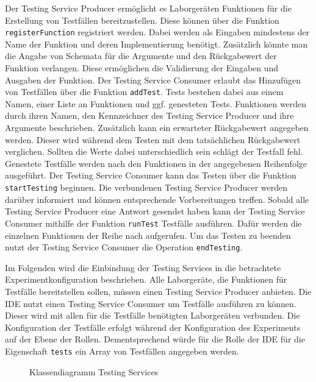Der Testing Service Producer ermöglicht es Laborgeräten Funktionen für die Erstellung von Testfällen bereitzustellen. Diese können über die Funktion \texttt{registerFunction} registriert werden. Dabei werden als Eingaben mindestens der Name der Funktion und deren Implementierung benötigt. Zusätzlich könnte man die Angabe von Schemata für die Argumente und den Rückgabewert der Funktion verlangen. Diese ermöglichen die Validierung der Eingaben und Ausgaben der Funktion. Der Testing Service Consumer erlaubt das Hinzufügen von Testfällen über die Funktion \texttt{addTest}. Tests bestehen dabei aus einem Namen, einer Liste an Funktionen und ggf. genesteten Tests. Funktionen werden durch ihren Namen, den Kennzeichner des Testing Service Producer und ihre Argumente beschrieben. Zusätzlich kann ein erwarteter Rückgabewert angegeben werden. Dieser wird während dem Testen mit dem tatsächlichen Rückgabewert verglichen. Sollten die Werte dabei unterschiedlich sein schlägt der Testfall fehl. Genestete Testfälle werden nach den Funktionen in der angegebenen Reihenfolge ausgeführt. Der Testing Service Consumer kann das Testen über die Funktion \texttt{startTesting} beginnen. Die verbundenen Testing Service Producer werden darüber informiert und können entsprechende Vorbereitungen treffen. Sobald alle Testing Service Producer eine Antwort gesendet haben kann der Testing Service Consumer mithilfe der Funktion \texttt{runTest} Testfälle ausführen. Dafür werden die einzelnen Funktionen der Reihe nach aufgerufen. Um das Testen zu beenden nutzt der Testing Service Consumer die Operation \texttt{endTesting}.

Im Folgenden wird die Einbindung der Testing Services in die betrachtete Experimentkonfiguration beschrieben. Alle Laborgeräte, die Funktionen für Testfälle bereitstellen sollen, müssen einen Testing Service Producer anbieten. Die IDE nutzt einen Testing Service Consumer um Testfälle ausführen zu können. Dieser wird mit allen für die Testfälle benötigten Laborgeräten verbunden. Die Konfiguration der Testfälle erfolgt während der Konfiguration des Experiments auf der Ebene der Rollen. Dementsprechend würde für die Rolle der IDE für die Eigenschaft \texttt{tests} ein Array von Testfällen angegeben werden.

\begin{figure}[tbp]
    \centering
    \caption{Klassendiagramm Testing Services}
    \label{figure:klassendiagramm-testing-services}
\end{figure}